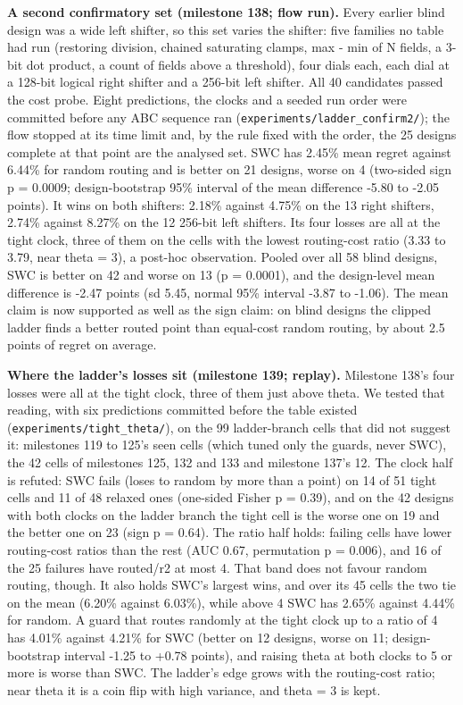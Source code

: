 \documentclass[conference]{IEEEtran}
\begin{document}
\textbf{A second confirmatory set (milestone 138; flow run).} Every
earlier blind design was a wide left shifter, so this set varies the
shifter: five families no table had run (restoring division, chained
saturating clamps, max - min of N fields, a 3-bit dot product, a count
of fields above a threshold), four dials each, each dial at a 128-bit
logical right shifter and a 256-bit left shifter. All 40 candidates
passed the cost probe. Eight predictions, the clocks and a seeded run
order were committed before any ABC sequence ran
(\texttt{experiments/\allowbreak{}ladder\_\allowbreak{}confirm2/\allowbreak{}}); the flow stopped at its time
limit and, by the rule fixed with the order, the 25 designs complete at
that point are the analysed set. SWC has 2.45\% mean regret against
6.44\% for random routing and is better on 21 designs, worse on 4
(two-sided sign p = 0.0009; design-bootstrap 95\% interval of the mean
difference -5.80 to -2.05 points). It wins on both shifters: 2.18\%
against 4.75\% on the 13 right shifters, 2.74\% against 8.27\% on the 12
256-bit left shifters. Its four losses are all at the tight clock, three
of them on the cells with the lowest routing-cost ratio (3.33 to 3.79,
near theta = 3), a post-hoc observation. Pooled over all 58 blind
designs, SWC is better on 42 and worse on 13 (p = 0.0001), and the
design-level mean difference is -2.47 points (sd 5.45, normal 95\%
interval -3.87 to -1.06). The mean claim is now supported as well as the
sign claim: on blind designs the clipped ladder finds a better routed
point than equal-cost random routing, by about 2.5 points of regret on
average.

\textbf{Where the ladder's losses sit (milestone 139; replay).}
Milestone 138's four losses were all at the tight clock, three of them
just above theta. We tested that reading, with six predictions committed
before the table existed (\texttt{experiments/\allowbreak{}tight\_\allowbreak{}theta/\allowbreak{}}), on the 99
ladder-branch cells that did not suggest it: milestones 119 to 125's
seen cells (which tuned only the guards, never SWC), the 42 cells of
milestones 125, 132 and 133 and milestone 137's 12. The clock half is
refuted: SWC fails (loses to random by more than a point) on 14 of 51
tight cells and 11 of 48 relaxed ones (one-sided Fisher p = 0.39), and
on the 42 designs with both clocks on the ladder branch the tight cell
is the worse one on 19 and the better one on 23 (sign p = 0.64). The
ratio half holds: failing cells have lower routing-cost ratios than the
rest (AUC 0.67, permutation p = 0.006), and 16 of the 25 failures have
routed/r2 at most 4. That band does not favour random routing, though.
It also holds SWC's largest wins, and over its 45 cells the two tie on
the mean (6.20\% against 6.03\%), while above 4 SWC has 2.65\% against
4.44\% for random. A guard that routes randomly at the tight clock up to
a ratio of 4 has 4.01\% against 4.21\% for SWC (better on 12 designs,
worse on 11; design-bootstrap interval -1.25 to +0.78 points), and
raising theta at both clocks to 5 or more is worse than SWC. The
ladder's edge grows with the routing-cost ratio; near theta it is a coin
flip with high variance, and theta = 3 is kept.
\end{document}
